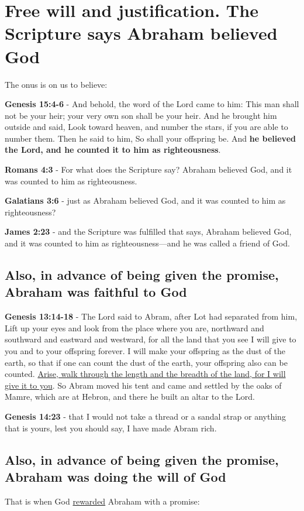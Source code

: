 \documentclass[11pt]{article}
\begin{document}
\section{Free will and justification. The Scripture says \textbf{Abraham} believed God}
\label{sec:orgbeee82b}
The onus is on us to believe:

\textbf{Genesis 15:4-6} - And behold, the word of the Lord came to him: This man shall not be your heir; your very own son shall be your heir. And he brought him outside and said, Look toward heaven, and number the stars, if you are able to number them. Then he said to him, So shall your offspring be. And \textbf{he believed the Lord, and he counted it to him as righteousness}.

\textbf{Romans 4:3} - For what does the Scripture say? Abraham believed God, and it was counted to him as righteousness.

\textbf{Galatians 3:6} - just as Abraham believed God, and it was counted to him as righteousness?

\textbf{James 2:23} - and the Scripture was fulfilled that says, Abraham believed God, and it was counted to him as righteousness—and he was called a friend of God.

\subsection{Also, in advance of being given the promise, Abraham was faithful to God}
\label{sec:orgb365e09}
\textbf{Genesis 13:14-18} - The Lord said to Abram, after Lot had separated from him, Lift up your eyes and look from the place where you are, northward and southward and eastward and westward, for all the land that you see I will give to you and to your offspring forever. I will make your offspring as the dust of the earth, so that if one can count the dust of the earth, your offspring also can be counted. \uline{Arise, walk through the length and the breadth of the land, for I will give it to you}. So Abram moved his tent and came and settled by the oaks of Mamre, which are at Hebron, and there he built an altar to the Lord.

\textbf{Genesis 14:23} - that I would not take a thread or a sandal strap or anything that is yours, lest you should say, I have made Abram rich.

\subsection{Also, in advance of being given the promise, Abraham was doing the will of God}
\label{sec:org61b34c7}
That is when God \uline{rewarded} Abraham with a promise:
\end{document}
